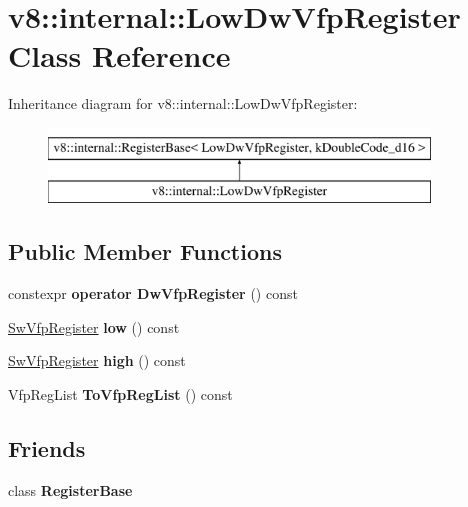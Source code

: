 \hypertarget{classv8_1_1internal_1_1LowDwVfpRegister}{}\section{v8\+:\+:internal\+:\+:Low\+Dw\+Vfp\+Register Class Reference}
\label{classv8_1_1internal_1_1LowDwVfpRegister}
Inheritance diagram for v8\+:\+:internal\+:\+:Low\+Dw\+Vfp\+Register\+:\begin{figure}[H]
\begin{center}
\leavevmode
\includegraphics[height=2.000000cm]{classv8_1_1internal_1_1LowDwVfpRegister}
\end{center}
\end{figure}
\subsection*{Public Member Functions}
\begin{DoxyCompactItemize}
\item 
\mbox{\label{classv8_1_1internal_1_1LowDwVfpRegister_aee122eceb6e274055c12e1c079a9abd7}} 
constexpr {\bfseries operator Dw\+Vfp\+Register} () const
\item 
\mbox{\label{classv8_1_1internal_1_1LowDwVfpRegister_aaa96b4d308be2c0a5378e7b28f9d73ed}} 
\mbox{\hyperlink{classv8_1_1internal_1_1SwVfpRegister}{Sw\+Vfp\+Register}} {\bfseries low} () const
\item 
\mbox{\label{classv8_1_1internal_1_1LowDwVfpRegister_a7deb23effeeec5b15553c5b243587761}} 
\mbox{\hyperlink{classv8_1_1internal_1_1SwVfpRegister}{Sw\+Vfp\+Register}} {\bfseries high} () const
\item 
\mbox{\label{classv8_1_1internal_1_1LowDwVfpRegister_ad23be3176bbcf013adae2cf525c3aed7}} 
Vfp\+Reg\+List {\bfseries To\+Vfp\+Reg\+List} () const
\end{DoxyCompactItemize}
\subsection*{Friends}
\begin{DoxyCompactItemize}
\item 
\mbox{\label{classv8_1_1internal_1_1LowDwVfpRegister_a762c32bfc1b920b5ead6f1c087b4a400}} 
class {\bfseries Register\+Base}
\end{DoxyCompactItemize}
